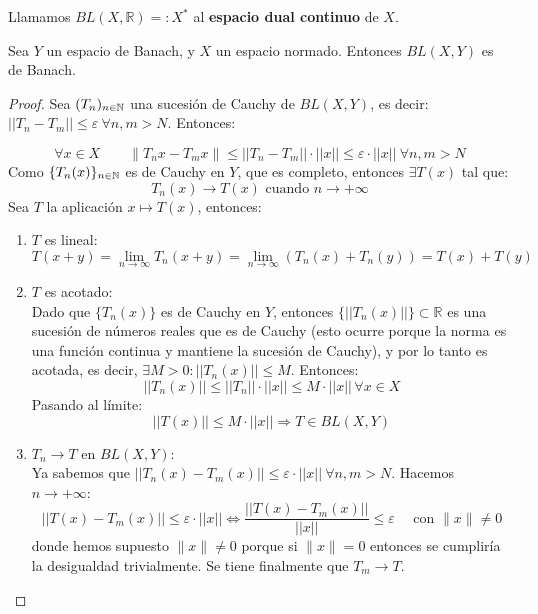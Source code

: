 \begin{definicion}
    Llamamos $BL(X, \mathbb{R}) =: X^*$ al \textbf{espacio dual continuo} de $X$. \\
\end{definicion}

\begin{teo}
    Sea $Y$ un espacio de Banach, y $X$ un espacio normado. Entonces $BL(X, Y)$ es de Banach.
\begin{proof}
    Sea $(T_n)_{n\in \mathbb{N}}$ una sucesión de Cauchy de $BL(X, Y)$, es decir: $||T_n - T_m|| \le \varepsilon \ \forall n, m > N$. Entonces:
    
    \begin{equation*}
        \forall x \in X \quad \quad \|T_n x - T_m x\| \le ||T_n - T_m|| \cdot ||x|| \le \varepsilon \cdot ||x|| \ \forall n, m > N
    \end{equation*}
    Como $\{T_n(x)\}_{n\in \mathbb{N}}$ es de Cauchy en $Y$, que es completo, entonces $\exists T(x)$ tal que:
    \begin{equation*}
        T_n(x) \to T(x) \text{ cuando } n \to +\infty
    \end{equation*}
    Sea $T$ la aplicación $x \mapsto T(x)$, entonces: 
    \begin{enumerate}
        \item[(i)] $T$ es lineal:
        \begin{equation*}
            T(x+y) = \lim_{n \to \infty} T_n(x+y) = \lim_{n \to \infty} (T_n(x) + T_n(y)) = T(x) + T(y)
        \end{equation*}
        \item[(ii)] $T$ es acotado: \\
        Dado que $\{T_n(x)\}$ es de Cauchy en $Y$, entonces $\{||T_n(x)||\} \subset \mathbb{R}$ es una sucesión de números reales que es de Cauchy (esto ocurre porque la norma es una función continua y mantiene la sucesión de Cauchy), y por lo tanto es acotada, es decir, $\exists M > 0 : ||T_n(x)|| \le M$. Entonces:
        \begin{equation*}
            ||T_n(x)|| \le ||T_n|| \cdot ||x|| \le M \cdot ||x|| \, \forall x \in X
        \end{equation*}
        Pasando al límite:
        \begin{equation*}
            ||T(x)|| \le M \cdot ||x|| \Rightarrow T \in BL(X, Y)
        \end{equation*}
        \item[(iii)] $T_n \to T$ en $BL(X, Y)$: \\
        Ya sabemos que $||T_n(x) - T_m (x)|| \le \varepsilon \cdot ||x|| \ \forall n, m > N$. Hacemos $n \to +\infty$:
        \begin{equation*}
            ||T(x) - T_m(x)|| \le \varepsilon \cdot ||x|| \iff \frac{||T(x) - T_m(x)||}{||x||} \le \varepsilon \quad \text{ con } \|x\|\neq 0
        \end{equation*}
        donde hemos supuesto $\|x\|\neq 0$ porque si $\|x\|=0$ entonces se cumpliría la desigualdad trivialmente. Se tiene finalmente que $T_m \to T$.
    \end{enumerate}
\end{proof}
\end{teo}

